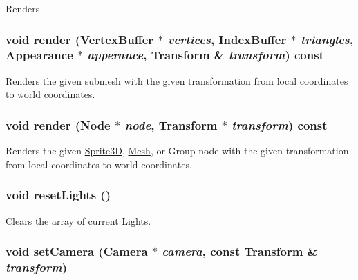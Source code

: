 Renders \hypertarget{classm3g_1_1Graphics3D_dc32291b31d6d3a32037eb9f727f73c0}{
\subsubsection[{render}]{\setlength{\rightskip}{0pt plus 5cm}void render ({\bf VertexBuffer} $\ast$ {\em vertices}, \/  {\bf IndexBuffer} $\ast$ {\em triangles}, \/  {\bf Appearance} $\ast$ {\em apperance}, \/  {\bf Transform} \& {\em transform}) const}}
\label{classm3g_1_1Graphics3D_dc32291b31d6d3a32037eb9f727f73c0}


Renders the given submesh with the given transformation from local coordinates to world coordinates. \hypertarget{classm3g_1_1Graphics3D_9c9ca78b3ce4cc358783a1a2701b9d85}{
\subsubsection[{render}]{\setlength{\rightskip}{0pt plus 5cm}void render ({\bf Node} $\ast$ {\em node}, \/  {\bf Transform} $\ast$ {\em transform}) const}}
\label{classm3g_1_1Graphics3D_9c9ca78b3ce4cc358783a1a2701b9d85}


Renders the given \hyperlink{classm3g_1_1Sprite3D}{Sprite3D}, \hyperlink{classm3g_1_1Mesh}{Mesh}, or Group node with the given transformation from local coordinates to world coordinates. \hypertarget{classm3g_1_1Graphics3D_b8821ec231e8ebd939ae0feaaf138542}{
\subsubsection[{resetLights}]{\setlength{\rightskip}{0pt plus 5cm}void resetLights ()}}
\label{classm3g_1_1Graphics3D_b8821ec231e8ebd939ae0feaaf138542}


Clears the array of current Lights. \hypertarget{classm3g_1_1Graphics3D_0df7bb61cfeba6626e20fd07ddd1c460}{
\subsubsection[{setCamera}]{\setlength{\rightskip}{0pt plus 5cm}void setCamera ({\bf Camera} $\ast$ {\em camera}, \/  const {\bf Transform} \& {\em transform})}}
\label{classm3g_1_1Graphics3D_0df7bb61cfeba6626e20fd07ddd1c460}


